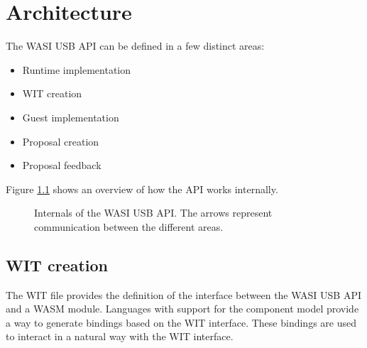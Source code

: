 \chapter{Architecture}
The \acrshort{WASI} \acrshort{USB} \acrshort{API} can be defined in a few distinct areas:

\begin{itemize}

\item Runtime implementation

\item WIT creation

\item Guest implementation

\item Proposal creation

\item Proposal feedback

\end{itemize} 

Figure \ref{image:api_areas} shows an overview of how the API works internally. 

\begin{figure}[!h]
\centering
{}
\caption{Internals of the WASI USB API. The arrows represent communication between the different areas.}
\label{image:api_areas}
\end{figure}

\section{WIT creation}
The WIT file provides the definition of the interface between the WASI USB API and a WASM module. Languages with support for the component model provide a way to generate bindings based on the WIT interface. These bindings are used to interact in a natural way with the WIT interface.

